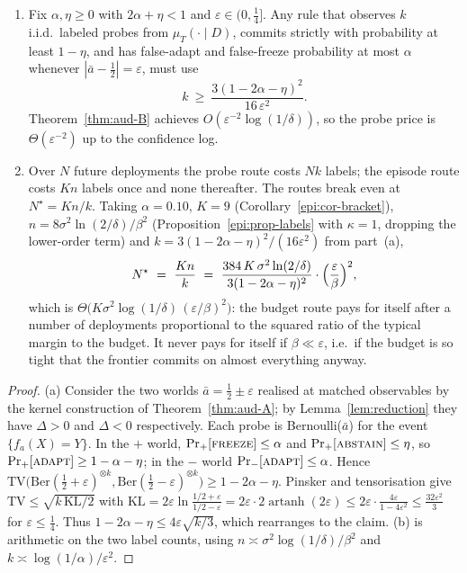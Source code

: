\begin{proposition}\label{epi:prop-probe}
\begin{enumerate}
\item[\textnormal{(a)}] Fix $\alpha,\eta\ge0$ with $2\alpha+\eta<1$ and $\varepsilon\in(0,\tfrac14]$.
Any rule that observes $k$ i.i.d.\ labeled probes from $\mu_T(\cdot\mid D)$, commits strictly with
probability at least $1-\eta$, and has false-adapt and false-freeze probability at most $\alpha$
whenever $|\bar a-\tfrac12|=\varepsilon$, must use
\[
k\ \ge\ \frac{3(1-2\alpha-\eta)^2}{16\,\varepsilon^{2}} .
\]
Theorem~\ref{thm:aud-B} achieves $O(\varepsilon^{-2}\log(1/\delta))$, so the probe price is
$\Theta(\varepsilon^{-2})$ up to the confidence log.
\item[\textnormal{(b)}] Over $N$ future deployments the probe route costs $Nk$ labels; the episode
route costs $Kn$ labels once and none thereafter. The routes break even at $N^\star=Kn/k$. Taking
$\alpha=0.10$, $K=9$ (Corollary~\ref{epi:cor-bracket}), $n=8\sigma^2\ln(2/\delta)/\beta^2$
(Proposition~\ref{epi:prop-labels} with $\kappa=1$, dropping the lower-order term) and
$k=3(1-2\alpha-\eta)^2/(16\varepsilon^2)$ from part~(a),
\[
N^\star\ =\ \frac{Kn}{k}\ =\ \frac{384\,K\,\sigma^{2}\ln(2/\delta)}{3(1-2\alpha-\eta)^{2}}
\cdot\Bigl(\frac{\varepsilon}{\beta}\Bigr)^{2},
\]
which is $\Theta\bigl(K\sigma^2\log(1/\delta)\,(\varepsilon/\beta)^2\bigr)$: the budget route pays
for itself after a number of deployments proportional to the squared ratio of the typical margin to
the budget. It never pays for itself if $\beta\ll\varepsilon$, i.e.\ if the budget is so tight that
the frontier commits on almost everything anyway.
\end{enumerate}
\end{proposition}

\begin{proof}
(a) Consider the two worlds $\bar a=\tfrac12\pm\varepsilon$ realised at matched observables by the
kernel construction of Theorem~\ref{thm:aud-A}; by Lemma~\ref{lem:reduction} they have
$\Delta>0$ and $\Delta<0$ respectively. Each probe is Bernoulli($\bar a$) for the event
$\{f_a(X)=Y\}$. In the $+$ world, $\Pr_+[\textsc{freeze}]\le\alpha$ and
$\Pr_+[\textsc{abstain}]\le\eta$, so $\Pr_+[\textsc{adapt}]\ge1-\alpha-\eta$; in the $-$ world
$\Pr_-[\textsc{adapt}]\le\alpha$. Hence
$\mathrm{TV}\bigl(\mathrm{Ber}(\tfrac12+\varepsilon)^{\otimes k},
\mathrm{Ber}(\tfrac12-\varepsilon)^{\otimes k}\bigr)\ge1-2\alpha-\eta$. Pinsker and tensorisation
give $\mathrm{TV}\le\sqrt{k\,\mathrm{KL}/2}$ with
$\mathrm{KL}=2\varepsilon\ln\frac{1/2+\varepsilon}{1/2-\varepsilon}
=2\varepsilon\cdot2\operatorname{artanh}(2\varepsilon)\le
2\varepsilon\cdot\frac{4\varepsilon}{1-4\varepsilon^2}\le\frac{32\varepsilon^2}{3}$
for $\varepsilon\le\tfrac14$. Thus $1-2\alpha-\eta\le4\varepsilon\sqrt{k/3}$, which rearranges to the
claim. (b) is arithmetic on the two label counts, using
$n\asymp\sigma^2\log(1/\delta)/\beta^2$ and $k\asymp\log(1/\alpha)/\varepsilon^2$.
\end{proof}

